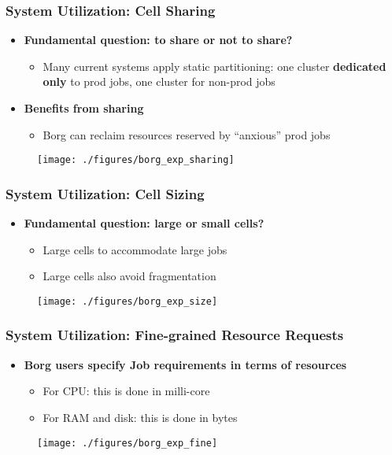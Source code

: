 \begin{frame}
\frametitle{System Utilization: Cell Sharing}
\begin{itemize}
	\item {\bf Fundamental question: to share or not to share?}
	\begin{itemize}
		\item Many current systems apply static partitioning: one cluster {\bf dedicated only} to prod jobs, one cluster for non-prod jobs
	\end{itemize}
	\item {\bf Benefits from sharing}
	\begin{itemize}
		\item Borg can reclaim resources reserved by ``anxious'' prod jobs 
	\end{itemize}
\end{itemize}
\begin{figure}[h]
  \centering
  \texttt{[image: ./figures/borg\_exp\_sharing]}
  \label{fig:borg_exp_sharing}
\end{figure}
\end{frame}

\begin{frame}
\frametitle{System Utilization: Cell Sizing}
\begin{itemize}
	\item {\bf Fundamental question: large or small cells?}
	\begin{itemize}
		\item Large cells to accommodate large jobs
		\item Large cells also avoid fragmentation
	\end{itemize}
\end{itemize}
\begin{figure}[h]
  \centering
  \texttt{[image: ./figures/borg\_exp\_size]}
  \label{fig:borg_exp_size}
\end{figure}
\end{frame}

\begin{frame}
\frametitle{System Utilization: Fine-grained Resource Requests}
\begin{itemize}
	\item {\bf Borg users specify Job requirements in terms of resources}
	\begin{itemize}
		\item For CPU: this is done in milli-core
		\item For RAM and disk: this is done in bytes
	\end{itemize}
\end{itemize}
\begin{figure}[h]
  \centering
  \texttt{[image: ./figures/borg\_exp\_fine]}
  \label{fig:borg_exp_size}
\end{figure}
\end{frame}

